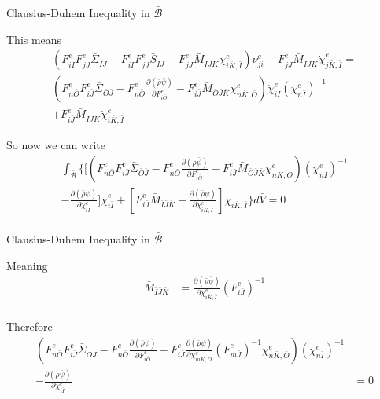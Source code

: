 \documentclass[11pt]{beamer}
\begin{document}
\begin{frame}{Clausius-Duhem Inequality in $\bar{\mathcal{B}}$}

This means
\begin{align*}
\left(F_{i\bar{I}}^e  F_{j\bar{J}}^e \bar{\Sigma}_{\bar{I}\bar{J}} - F_{i\bar{I}}^e F_{j\bar{J}}^e \bar{S}_{\bar{I}\bar{J}} - F_{j\bar{J}}^e\bar{M}_{\bar{I}\bar{J}\bar{K}} \chi_{i\bar{K},\bar{I}}^e\right)\nu_{ji}^e + F_{j\bar{J}}^e\bar{M}_{\bar{I}\bar{J}\bar{K}} \dot{\chi}_{j\bar{K},\bar{I}}^e =\\
\left(F_{n\bar{O}}^e  F_{i\bar{J}}^e \bar{\Sigma}_{\bar{O}\bar{J}} - F_{n\bar{O}}^e \frac{\partial\left(\bar{\rho}\bar{\psi}\right)}{\partial F_{i\bar{O}}^e} - F_{i\bar{J}}^e\bar{M}_{\bar{O}\bar{J}\bar{K}} \chi_{n\bar{K},\bar{O}}^e\right)\dot{\chi}_{i\bar{I}}^e\left(\chi_{n\bar{I}}^e\right)^{-1}\\ + F_{i\bar{J}}^e\bar{M}_{\bar{I}\bar{J}\bar{K}} \dot{\chi}_{i\bar{K},\bar{I}}^e
\end{align*}

So now we can write
\begin{align*}
 \int_{\bar{\mathcal{B}}} \bigg\{\bigg[\left(F_{n\bar{O}}^e  F_{i\bar{J}}^e \bar{\Sigma}_{\bar{O}\bar{J}} - F_{n\bar{O}}^e \frac{\partial\left(\bar{\rho}\bar{\psi}\right)}{\partial F_{i\bar{O}}^e} - F_{i\bar{J}}^e\bar{M}_{\bar{O}\bar{J}\bar{K}} \chi_{n\bar{K},\bar{O}}^e\right)\left(\chi_{n\bar{I}}^e\right)^{-1}\\
 - \frac{\partial\left(\bar{\rho}\bar{\psi}\right)}{\partial \chi_{i\bar{I}}^e}\bigg] \dot{\chi}_{i\bar{I}}^e+ \left[ F_{i\bar{J}}^e \bar{M}_{\bar{I}\bar{J}\bar{K}} - \frac{\partial \left(\bar{\rho}\bar{\psi}\right)}{\partial \chi_{i\bar{K},\bar{I}}^e}\right] \dot{\chi}_{i\bar{K},\bar{I}} \bigg\} d\bar{V} =  0\\
\end{align*}

\end{frame}

\begin{frame}{Clausius-Duhem Inequality in $\bar{\mathcal{B}}$}

Meaning
\begin{align*}
\bar{M}_{\bar{I}\bar{J}\bar{K}}&= \frac{\partial \left(\bar{\rho}\bar{\psi}\right)}{\partial \chi_{i\bar{K},\bar{I}}^e}\left(F_{i\bar{J}}^e\right)^{-1}\\
\end{align*}

Therefore
\begin{align*}
\left(F_{n\bar{O}}^e  F_{i\bar{J}}^e \bar{\Sigma}_{\bar{O}\bar{J}} - F_{n\bar{O}}^e \frac{\partial\left(\bar{\rho}\bar{\psi}\right)}{\partial F_{i\bar{O}}^e} - F_{i\bar{J}}^e\frac{\partial \left(\bar{\rho}\bar{\psi}\right)}{\partial \chi_{m\bar{K},\bar{O}}^e}\left(F_{m\bar{J}}^e\right)^{-1} \chi_{n\bar{K},\bar{O}}^e\right)\left(\chi_{n\bar{I}}^e\right)^{-1}\\
 - \frac{\partial\left(\bar{\rho}\bar{\psi}\right)}{\partial \chi_{i\bar{I}}^e} &= 0
\end{align*}

\end{frame}
\end{document}
